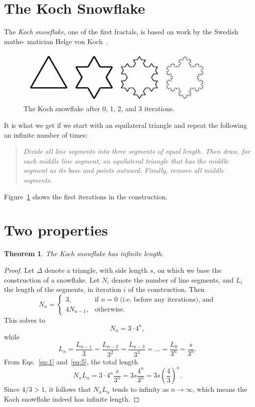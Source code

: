 \documentclass[12pt,a4paper]{article}
\newtheorem{theorem}{Theorem}
\begin{document}
\section{The Koch Snowflake}

The \emph{Koch snowflake},
one of the first fractals, is based on work by the Swedish mathe-
matician Helge von Koch~\cite{koch}.
\begin{figure}[h] \label{koch}
  \centering
	\includegraphics[width=10cm]{snowflake.jpg}
  \caption{The Koch snowflake after 0, 1, 2, and 3 iterations. }
\end{figure}
It is what we get if we start with an equilateral triangle and repeat the following an infinite number of times:
\begin{quote}
\textit{Divide all line segments into three segments of equal length. Then draw, for each middle line segment, an equilateral triangle that has the middle segment as its base and points outward. Finally, remove all middle segments. }
\end{quote}
Figure~\ref{koch} shows the first iterations in the construction.
\section{Two properties}
\begin{theorem}
  The Koch snowflake has infinite length. 
\end{theorem}
\begin{proof}
   Let $\Delta$ denote a triangle, with side length $s$, on which we base the construction of a snowflake. Let $N_i$ denote the number of line segments, and $L_i$ the length of the segments, in iteration $i$ of the construction. Then 
  \begin{displaymath}
    N_n=
    \begin{cases}
      3,       &\text{if $n=0$ (i.e.~before any iterations), and} \\ 
      4N_{n-1},&\text{otherwise.}
    \end{cases}
  \end{displaymath}
  This solves to
  \begin{equation}
    \label{eq:1}
    N_n = 3 \cdot 4^n,
  \end{equation}
   while
  \begin{equation}
    \label{eq:5}
    L_n = \frac{L_{n-1}}{3} = \frac{L_{n-2}}{3^2} = \frac{L_{n-3}}{3^3} = \ldots = \frac{L_0}{3^n} = \frac{s}{3^n}.
  \end{equation}
  From Eqs.~\ref{eq:1}  and~\ref{eq:5}, the total length
  \begin{displaymath}
    N_nL_n = 3 \cdot 4^n\frac{s}{3^n} = 3s\frac{4^n}{3^n} = 3s\left(\frac{4}{3}\right)^n.
  \end{displaymath}
  Since $4/3 > 1$, it follows that $N_nL_n$ tends to infinity as $n \to \infty$, which means the Koch snowflake indeed has infinite length.
\end{proof}
\end{document}
